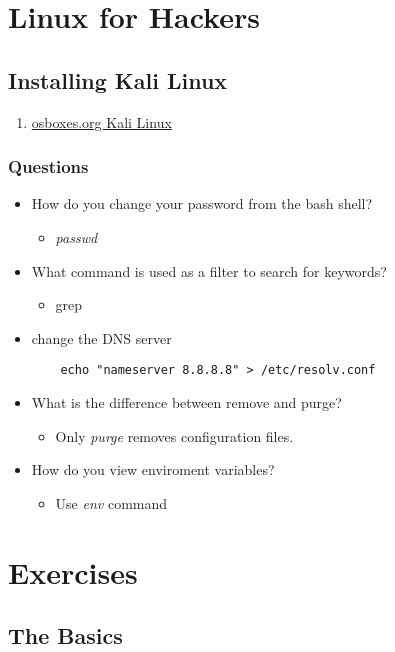 \documentclass[12pt,letterpaper]{article}
\begin{document}
\section{Linux for Hackers}
\subsection{Installing Kali Linux} 
\begin{enumerate}
    \item \href{https://www.osboxes.org/kali-linux/}{osboxes.org Kali Linux}
\end{enumerate}
\subsubsection{Questions}
\begin{itemize}
    \item How do you change your password from the bash shell? 
    \begin{itemize}
        \item \textit{passwd}
    \end{itemize}
    \item What command is used as a filter to search for keywords? 
    \begin{itemize}
        \item grep
    \end{itemize}
    \item change the DNS server 
    \begin{lstlisting}
    echo "nameserver 8.8.8.8" > /etc/resolv.conf
    \end{lstlisting}
    \item What is the difference between remove and purge? 
    \begin{itemize}
        \item Only \textit{purge} removes configuration files. 
    \end{itemize}
    \item How do you view enviroment variables? 
    \begin{itemize}
        \item Use \textit{env} command
    \end{itemize}
\end{itemize}
\section{Exercises}
\subsection{The Basics}
\end{document}

